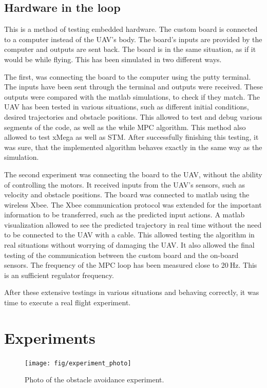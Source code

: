 \documentclass[a4paper,11pt,titlepage]{article}
\newcommand{\jed}[1]{\ensuremath{~\mathrm{#1}}}
\begin{document}
\subsection{Hardware in the loop}
This is a method of testing embedded hardware. The custom board is connected to a computer instead of the UAV's body. The board's inputs are provided by the computer and outputs are sent back. The board is in the same situation, as if it would be while flying. This has been simulated in two different ways. 

The first, was connecting the board to the computer using the putty terminal. The inputs have been sent through the terminal and outputs were received. These outputs were compared with the matlab simulations, to check if they match. The UAV has been tested in various situations, such as different initial conditions, desired trajectories and obstacle positions. This allowed to test and debug various segments of the code, as well as the while MPC algorithm. This method also allowed to test xMega as well as STM. After successfully finishing this testing, it was sure, that the implemented algorithm behaves exactly in the same way as the simulation.

The second experiment was connecting the board to the UAV, without the ability of controlling the motors. It received inputs from the UAV's sensors, such as velocity and obstacle positions. The board was connected to matlab using the wireless Xbee. The Xbee communication protocol was extended for the important information to be transferred, such as the predicted input actions. A matlab visualization allowed to see the predicted trajectory in real time without the need to be connected to the UAV with a cable. This allowed testing the algorithm in real situations without worrying of damaging the UAV. It also allowed the final testing of the communication between the custom board and the on-board sensors. The frequency of the MPC loop has been measured close to 20\jed{Hz}. This is an sufficient regulator frequency.

After these extensive testings in various situations and behaving correctly, it was time to execute a real flight experiment.

\section{Experiments}

\begin{figure}[h]
\centering
\texttt{[image: fig/experiment\_photo]}
\caption{Photo of the obstacle avoidance experiment.}
\label{fig:move_blocking}
\centering
\end{figure}
\end{document}
